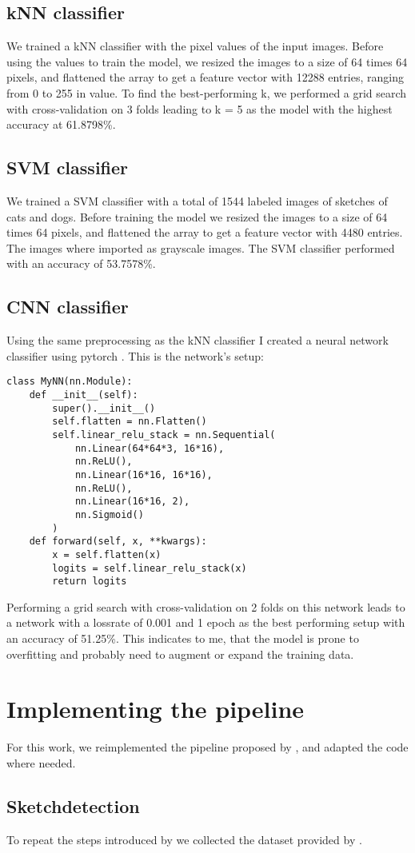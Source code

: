 \subsection*{kNN classifier}
We trained a kNN classifier with the pixel values of the input images. Before
using the values to train the model, we resized the images to a size of 64 times 
64 pixels, and flattened the array to get a feature vector with 12288 entries, 
ranging from 0 to 255 in value. To find the best-performing k, we performed a
grid search with cross-validation on 3 folds leading to k = 5 as the model with 
the highest accuracy at 61.8798\%.

\subsection*{SVM classifier}
We trained a SVM classifier with a total of 1544 labeled images of sketches of
cats and dogs. Before training the model we resized the images to a size of 64
times 64 pixels, and flattened the array to get a feature vector with 4480
entries. The images where imported as grayscale images. The SVM classifier
performed with an accuracy of 53.7578\%.


\subsection*{CNN classifier}
Using the same preprocessing as the kNN classifier I created a neural network
classifier using pytorch \textcite{pytorch}. This is the network's setup:

\begin{lstlisting}
class MyNN(nn.Module):
    def __init__(self):
        super().__init__()
        self.flatten = nn.Flatten()
        self.linear_relu_stack = nn.Sequential(
            nn.Linear(64*64*3, 16*16),
            nn.ReLU(),
            nn.Linear(16*16, 16*16),
            nn.ReLU(),
            nn.Linear(16*16, 2),
            nn.Sigmoid()
        )
    def forward(self, x, **kwargs):
        x = self.flatten(x)
        logits = self.linear_relu_stack(x)
        return logits
\end{lstlisting}

Performing a grid search with cross-validation on 2 folds on this network leads
to a network with a lossrate of 0.001 and 1 epoch as the best performing setup
with an accuracy of 51.25\%. This indicates to me, that the model is prone to
overfitting and probably need to augment or expand the training data.

\section*{Implementing the pipeline}
For this work, we reimplemented the pipeline proposed by
\textcite{korpitsch-2023-sao}, and adapted the code where needed.

\subsection*{Sketchdetection}
To repeat the steps introduced by \textcite{korpitsch-2023-sao} we collected the
dataset provided by \textcite{sarvadevabhatla2017sketchparse}.